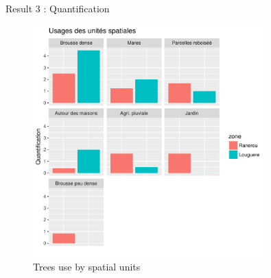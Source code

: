 \documentclass[newPxFont]{beamer}
\begin{document}
\begin{frame}[c]{Result 3 : Quantification}
\vspace{-1cm}
\begin{figure}
  \centering
  \includegraphics[width = 0.8\textwidth]{img/papier-figBar1}
  \caption{Trees use by spatial units}
\end{figure}

\end{frame}
\end{document}
